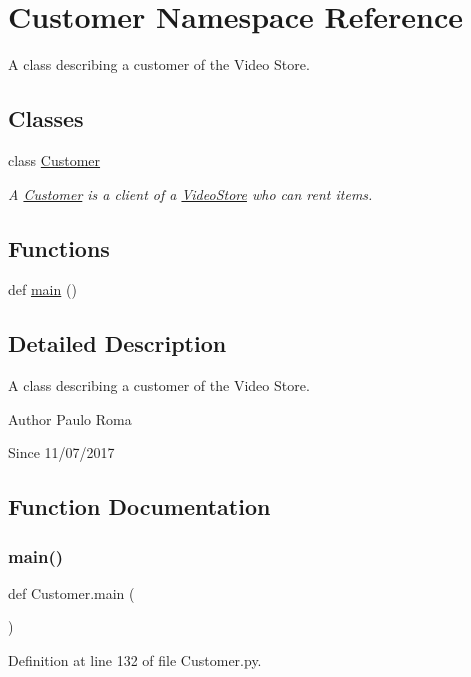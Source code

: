 \hypertarget{namespaceCustomer}{}\section{Customer Namespace Reference}
\label{namespaceCustomer}


A class describing a customer of the Video Store.  


\subsection*{Classes}
\begin{DoxyCompactItemize}
\item 
class \hyperlink{classCustomer_1_1Customer}{Customer}
\begin{DoxyCompactList}\small\item\em A \hyperlink{classCustomer_1_1Customer}{Customer} is a client of a \hyperlink{namespaceVideoStore}{Video\+Store} who can rent items. \end{DoxyCompactList}\end{DoxyCompactItemize}
\subsection*{Functions}
\begin{DoxyCompactItemize}
\item 
def \hyperlink{namespaceCustomer_a0ca159d489f39b0d2073130a65e6c0cc}{main} ()
\end{DoxyCompactItemize}


\subsection{Detailed Description}
A class describing a customer of the Video Store. 

\begin{DoxyAuthor}{Author}
Paulo Roma 
\end{DoxyAuthor}
\begin{DoxySince}{Since}
11/07/2017 
\end{DoxySince}


\subsection{Function Documentation}
\mbox{\label{namespaceCustomer_a0ca159d489f39b0d2073130a65e6c0cc}} 
\subsubsection{\texorpdfstring{main()}{main()}}
{\footnotesize\ttfamily def Customer.\+main (\begin{DoxyParamCaption}{ }\end{DoxyParamCaption})}



Definition at line 132 of file Customer.\+py.

